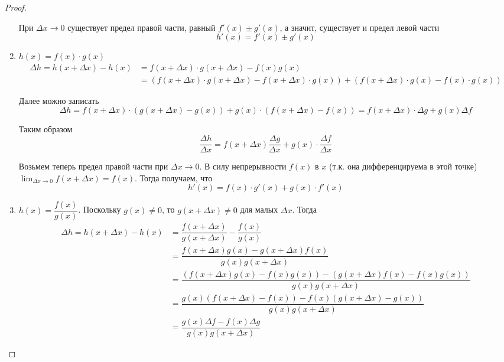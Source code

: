 \documentclass[a4paper]{article}
\theoremstyle{named}
\begin{document}
\begin{colloq}
\begin{proof}
\begin{enumerate}
				При $\Delta x \to 0$ существует предел правой части, равный $f'(x) \pm g'(x)$, а значит, существует и предел левой части
				\begin{equation*}
					h'(x) = f'(x) \pm g'(x)
				\end{equation*}


				\item
				$h(x) = f(x) \cdot g(x)$
				\begin{align*}
					\Delta h 
					= h(x + \Delta x) - h(x)
					&= f(x + \Delta x) \cdot g(x + \Delta x) - f(x)g(x) \\
					&=(f(x + \Delta x) \cdot g(x + \Delta x) - f(x + \Delta x) \cdot g(x)) + (f(x + \Delta x) \cdot g(x) - f(x) \cdot g(x))
				\end{align*}

				Далее можно записать
				\begin{equation*}
					\Delta h = f(x + \Delta x) \cdot (g(x + \Delta x) - g(x)) + g(x) \cdot (f(x + \Delta x) - f(x)) = f(x + \Delta x) \cdot \Delta g + g(x) \Delta f
				\end{equation*}

				Таким образом
				\begin{equation*}
					\dfrac{\Delta h}{\Delta x} = f(x + \Delta x) \dfrac{\Delta g}{\Delta x} + g(x) \cdot \dfrac{\Delta f}{\Delta x}
				\end{equation*}

				Возьмем теперь предел правой части при $\Delta x \to 0$. В силу непрерывности $f(x)$ в $x$ (т.к. она дифференцируема в этой точке) $\lim_{\Delta x \to 0} f(x + \Delta x) = f(x)$. Тогда получаем, что
				\begin{equation*}
					h'(x) = f(x) \cdot g'(x) + g(x) \cdot f'(x)
				\end{equation*}


				\item
				$h(x) = \dfrac{f(x)}{g(x)}$. Поскольку $g(x) \neq 0$, то $g(x + \Delta x) \neq 0$ для малых $\Delta x$. Тогда
				\begin{align*}
					\Delta h
					= h(x + \Delta x) - h(x)
					&= \dfrac{f(x + \Delta x)}{g(x + \Delta x)} - \dfrac{f(x)}{g(x)} \\
					&= \dfrac{f(x + \Delta x)g(x) - g(x + \Delta x)f(x)}{g(x)g(x + \Delta x)} \\
					&= \dfrac{(f(x + \Delta x)g(x) - f(x)g(x)) - (g(x + \Delta x)f(x) - f(x)g(x))}{g(x)g(x + \Delta x)} \\
					&= \dfrac{g(x)(f(x + \Delta x) - f(x)) - f(x)(g(x + \Delta x) - g(x))}{g(x)g(x + \Delta x)} \\
					&= \dfrac{g(x)\Delta f - f(x) \Delta g}{g(x)g(x + \Delta x)}
				\end{align*}


\end{enumerate}
\end{proof}
\end{colloq}
\end{document}
